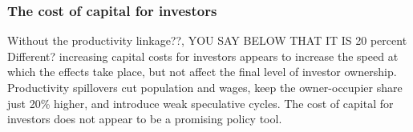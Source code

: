 \subsubsection{The cost of capital for investors}

{\color{red}Without the productivity linkage??, YOU SAY BELOW THAT IT IS 20 percent Different?} increasing capital costs for investors appears to increase the speed at which the effects take place, but not affect the final level of investor ownership. Productivity spillovers cut population and wages, keep the owner-occupier share just 20\% higher, and introduce weak speculative cycles. The cost of capital for investors does not appear to be a promising policy tool.


